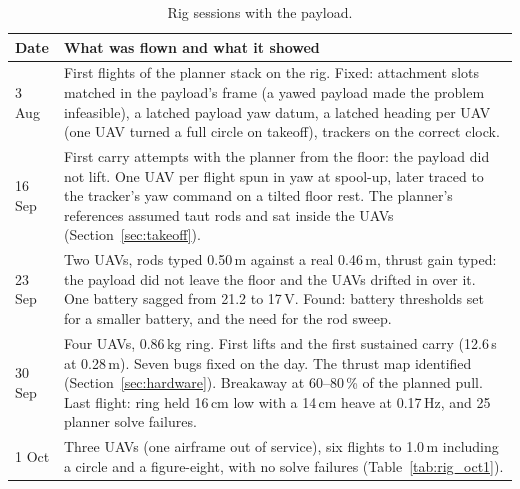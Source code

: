 \begin{table}[h]
\centering
\small
\caption{Rig sessions with the payload.}
\label{tab:rig_days}
\begin{tabularx}{\textwidth}{lX}
\toprule
Date & What was flown and what it showed \\
\midrule
3 Aug & First flights of the planner stack on the rig. Fixed: attachment slots matched in the
payload's frame (a yawed payload made the problem infeasible), a latched payload yaw datum, a latched
heading per UAV (one UAV turned a full circle on takeoff), trackers on the correct clock. \\
16 Sep & First carry attempts with the planner from the floor: the payload did not lift. One UAV per
flight spun in yaw at spool-up, later traced to the tracker's yaw command on a tilted floor rest. The planner's references assumed taut rods and sat inside
the UAVs (Section~\ref{sec:takeoff}). \\
23 Sep & Two UAVs, rods typed 0.50\,m against a real 0.46\,m, thrust gain typed: the payload did not
leave the floor and the UAVs drifted in over it. One battery sagged from 21.2 to 17\,V. Found: battery
thresholds set for a smaller battery, and the need for the rod sweep. \\
30 Sep & Four UAVs, 0.86\,kg ring. First lifts and the first sustained carry (12.6\,s at 0.28\,m). Seven
bugs fixed on the day. The thrust map identified (Section~\ref{sec:hardware}). Breakaway at 60--80\,\%
of the planned pull. Last flight: ring held 16\,cm low with a 14\,cm heave at 0.17\,Hz, and 25 planner
solve failures. \\
1 Oct & Three UAVs (one airframe out of service), six flights to 1.0\,m including a circle and a
figure-eight, with no solve failures (Table~\ref{tab:rig_oct1}). \\
\bottomrule
\end{tabularx}
\end{table}


